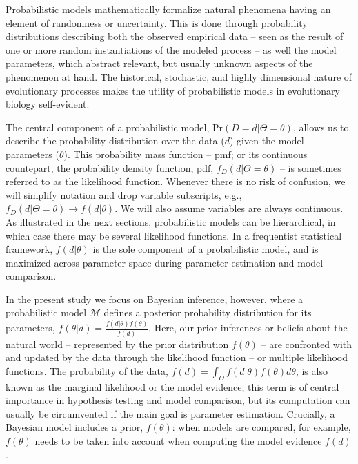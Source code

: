 \documentclass[oneside]{article}
\begin{document}
Probabilistic models mathematically formalize natural phenomena
having an element of randomness or uncertainty.
This is done through probability distributions describing both the observed
empirical data -- seen as the result of one or more random
instantiations of the modeled process -- as well the model parameters,
which abstract relevant, but usually unknown aspects
of the phenomenon at hand.
The historical, stochastic, and highly dimensional nature of evolutionary
processes makes the utility of probabilistic models in evolutionary
biology self-evident. 

The central component of a probabilistic model, $\text{Pr}(D=d|\Theta=\theta)$,
allows us to describe the probability distribution over the data ($d$) given the model
parameters ($\theta$).
This probability mass function -- pmf; or its continuous
countepart, the probability density function, pdf, $f_D(d|\Theta=\theta)$ -- is sometimes
referred to as the likelihood function.
Whenever there is no risk of confusion, we will simplify notation and drop variable subscripts, e.g., $f_D(d|\Theta=\theta) \rightarrow f(d|\theta)$.
We will also assume variables are always continuous.
As illustrated in the next sections, probabilistic models can be
hierarchical, in which case there may be several likelihood functions.
In a frequentist statistical framework, $f(d|\theta)$ is the sole
component of a probabilistic model, and is maximized across parameter space during
parameter estimation and model comparison.

In the present study we focus on Bayesian inference, however, 
where a probabilistic model $\mathcal{M}$ defines a posterior probability
distribution for its parameters, $f(\theta|d) =
\frac{f(d|\theta)f(\theta)}{f(d)}$.
Here, our prior inferences or beliefs about the natural world -- represented by
the prior distribution $f(\theta)$ -- are confronted with and updated by
the data through the likelihood function -- or multiple likelihood functions.
The probability of the data, $f(d) = \int_\Theta f(d|\theta)f(\theta)d\theta$, is also known as the marginal likelihood or the model evidence;
this term is of central importance in hypothesis testing and model comparison, but its computation can usually be circumvented if the main goal is parameter estimation.
Crucially, a Bayesian model includes a prior, $f(\theta)$:
when models are compared, for example, $f(\theta)$ needs to be taken
into account when computing the model evidence $f(d)$.
\end{document}
